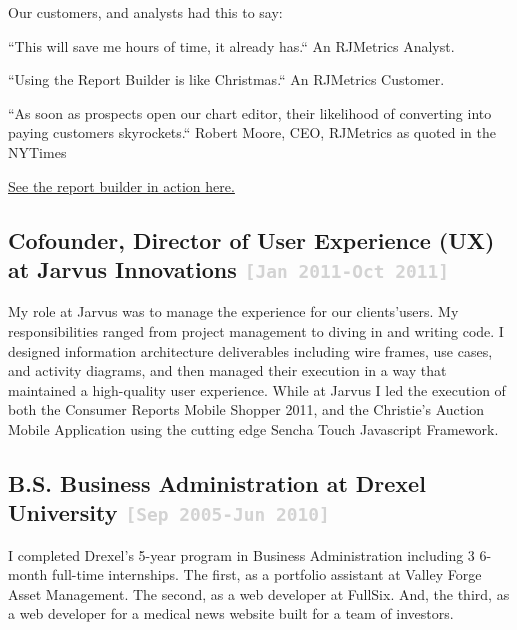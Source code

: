 \documentclass{tufte-handout}
\newcommand{\shstandout}[1]{\textbf{\textcolor{BurntOrange}{#1}}}
\newcommand{\shyears}[1]{\small{\texttt{\textcolor{LightGray}{#1}}}}
\begin{document}
Our customers, and analysts had this to say:

``This will save me hours of time, it already has.``
An RJMetrics Analyst.

``Using the Report Builder is like Christmas.``
An RJMetrics Customer.

``As soon as prospects open our chart editor, their likelihood of converting into paying customers skyrockets.``
Robert Moore, CEO, RJMetrics as quoted in the NYTimes

\href{https://magento.com/resources/tag/product-demo\%3A-business-intelligence}{See the report builder in action here.}

\subsection{\textbf{Cofounder, Director of User Experience (UX)} at \shstandout{Jarvus Innovations} \shyears{[Jan 2011-Oct 2011]}}

My role at Jarvus was to manage the experience for our clients'​ users. My responsibilities ranged from project management to diving in and writing code. I designed information architecture deliverables including wire frames, use cases, and activity diagrams, and then managed their execution in a way that maintained a high-quality user experience.
While at Jarvus I led the execution of both the Consumer Reports Mobile Shopper 2011, and the Christie's Auction Mobile Application using the cutting edge Sencha Touch Javascript Framework.


\subsection{\textbf{B.S. Business Administration} at \shstandout{Drexel University} \shyears{[Sep 2005-Jun 2010]}}
I completed Drexel's 5-year program in Business Administration including 3 6-month full-time internships. The first, as a portfolio assistant at Valley Forge Asset Management. The second, as a web developer at FullSix. And, the third, as a web developer for a medical news website built for a team of investors.
\end{document}
